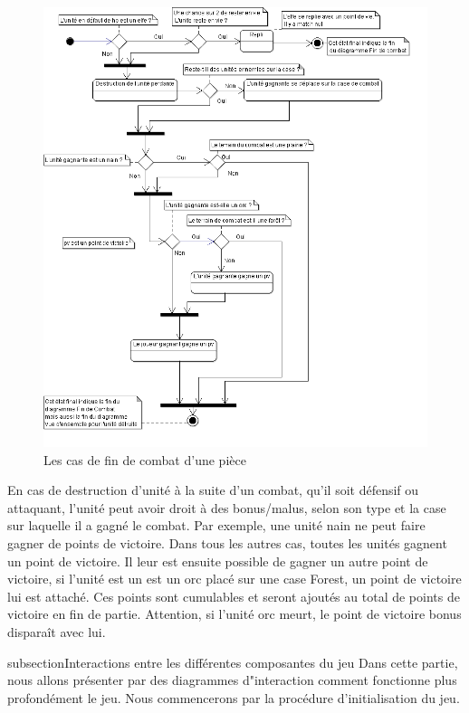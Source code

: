 \begin{figure}[!h]
\centering
\includegraphics[width=1\textwidth]{img/FinDeCombat.png}
\caption{Les cas de fin de combat d'une pièce}
\end{figure}

En cas de destruction d'unité à la suite d'un combat, qu'il soit défensif ou attaquant, l'unité peut avoir droit à des bonus/malus, selon son type et la case sur laquelle il a gagné le combat. Par exemple, une unité nain ne peut faire gagner de points de victoire. Dans tous les autres cas, toutes les unités gagnent un point de victoire. Il leur est ensuite possible de gagner un autre point de victoire, si l'unité est un est un orc placé sur une case Forest, un point de victoire lui est attaché. Ces points sont cumulables et seront ajoutés au total de points de victoire en fin de partie. Attention, si l'unité orc meurt, le point de victoire bonus disparaît avec lui. 

subsection{Interactions entre les différentes composantes du jeu}
Dans cette partie, nous allons présenter par des diagrammes d"interaction comment fonctionne plus profondément le jeu. Nous commencerons par la procédure d'initialisation du jeu.

